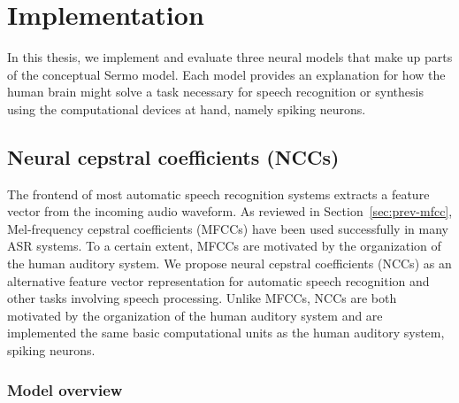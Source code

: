 \chapter{Implementation}
\label{chapt:implementation}

In this thesis, we implement and evaluate
three neural models that make up
parts of the conceptual Sermo model.
Each model provides
an explanation for how the human brain might
solve a task necessary for
speech recognition or synthesis
using the computational devices at hand,
namely spiking neurons.

\section{Neural cepstral coefficients (NCCs)}
\label{sec:ncc}


The frontend of most automatic speech recognition systems
extracts a feature vector from the incoming audio waveform.
As reviewed in Section~\ref{sec:prev-mfcc},
Mel-frequency cepstral coefficients (MFCCs)
have been used successfully in many ASR systems.
To a certain extent, MFCCs are motivated
by the organization of the human auditory system.
We propose neural cepstral coefficients (NCCs)
as an alternative feature vector representation
for automatic speech recognition
and other tasks involving speech processing.
Unlike MFCCs, NCCs are both motivated
by the organization of the human auditory system
and are implemented the same basic computational units
as the human auditory system, spiking neurons.

\subsection{Model overview}


